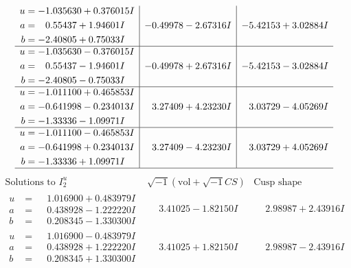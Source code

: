 \documentclass[1p]{elsarticle_modified}
\theoremstyle{definition}
\newcommand{\I}{\sqrt{-1}}
\begin{document}
$$\begin{array}{c|c|c}
\begin{aligned}
u &= -1.035630 + 0.376015 I \\
a &= \phantom{-}0.55437 + 1.94601 I \\
b &= -2.40805 + 0.75033 I\end{aligned}
 & -0.49978 - 2.67316 I & -5.42153 + 3.02884 I \\ \hline\begin{aligned}
u &= -1.035630 - 0.376015 I \\
a &= \phantom{-}0.55437 - 1.94601 I \\
b &= -2.40805 - 0.75033 I\end{aligned}
 & -0.49978 + 2.67316 I & -5.42153 - 3.02884 I \\ \hline\begin{aligned}
u &= -1.011100 + 0.465853 I \\
a &= -0.641998 - 0.234013 I \\
b &= -1.33336 - 1.09971 I\end{aligned}
 & \phantom{-}3.27409 + 4.23230 I & \phantom{-}3.03729 - 4.05269 I \\ \hline\begin{aligned}
u &= -1.011100 - 0.465853 I \\
a &= -0.641998 + 0.234013 I \\
b &= -1.33336 + 1.09971 I\end{aligned}
 & \phantom{-}3.27409 - 4.23230 I & \phantom{-}3.03729 + 4.05269 I\\
 \hline 
 \end{array}$$\newpage$$\begin{array}{c|c|c}  
\text{Solutions to }I^u_{2}& \I (\text{vol} + \sqrt{-1}CS) & \text{Cusp shape}\\
 \hline 
\begin{aligned}
u &= \phantom{-}1.016900 + 0.483979 I \\
a &= \phantom{-}0.438928 - 1.222220 I \\
b &= \phantom{-}0.208345 - 1.330300 I\end{aligned}
 & \phantom{-}3.41025 - 1.82150 I & \phantom{-}2.98987 + 2.43916 I \\ \hline\begin{aligned}
u &= \phantom{-}1.016900 - 0.483979 I \\
a &= \phantom{-}0.438928 + 1.222220 I \\
b &= \phantom{-}0.208345 + 1.330300 I\end{aligned}
 & \phantom{-}3.41025 + 1.82150 I & \phantom{-}2.98987 - 2.43916 I \\ \hline\begin{aligned}

\end{aligned}
\end{array}$$
\end{document}
